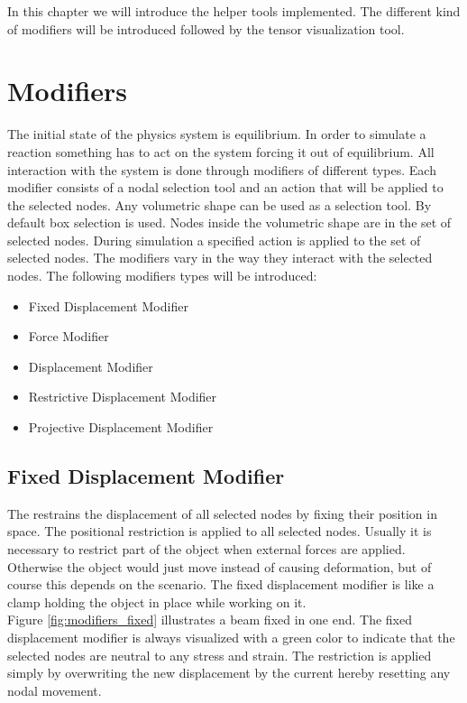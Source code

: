 
In this chapter we will introduce the helper tools implemented. The
different kind of modifiers will be introduced followed by the tensor
visualization tool.

\section{Modifiers}
\label{sec:modifiers}
The initial state of the physics system is equilibrium. In order to
simulate a reaction something has to act on the system forcing
it out of equilibrium. All interaction with the system is done
through modifiers of different types.
%
Each modifier consists of a nodal
selection tool and an action that will be applied to the selected
nodes.     
%
Any volumetric shape can be used as a selection tool. By default box
selection is used. Nodes inside the volumetric shape are in the set of 
selected nodes. During simulation a specified action is applied to the
set of selected nodes.
%
The modifiers vary in the way they interact with the selected
nodes. The following modifiers types will be introduced:

\begin{itemize}
\item Fixed Displacement Modifier
\item Force Modifier
\item Displacement Modifier
\item Restrictive Displacement Modifier
\item Projective Displacement Modifier
\end{itemize}

\subsection{Fixed Displacement Modifier}
The  restrains the
displacement of all selected nodes by fixing their position in
space. The positional restriction is applied to all selected
nodes. Usually it is
necessary to restrict part of the object when external forces are
applied. Otherwise the object would just move instead of causing
deformation, but of course this depends on the scenario. 
The fixed displacement modifier is like a clamp holding
the object in place while working on it. \\

Figure \vref{fig:modifiers_fixed} illustrates a beam fixed in one
end. The fixed displacement modifier is always visualized with a green
color to indicate that the selected nodes are neutral to any stress
and strain. The restriction
is applied simply by overwriting the new displacement by the current
hereby resetting any nodal movement.

